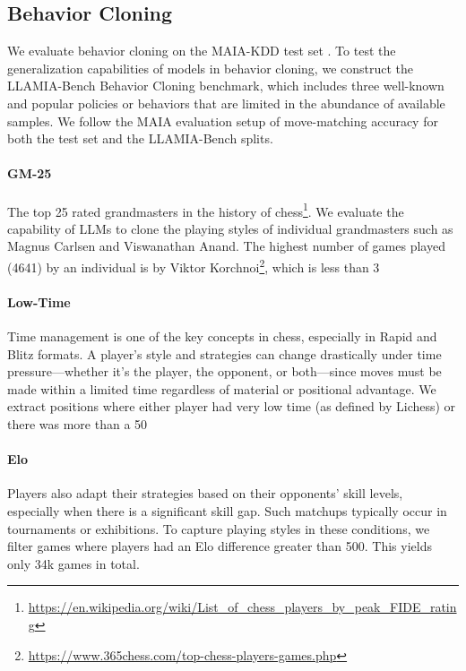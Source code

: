 \documentclass{article}
\theoremstyle{plain}
\theoremstyle{definition}
\theoremstyle{remark}
\begin{document}
\subsection{Behavior Cloning}
We evaluate behavior cloning on the MAIA-KDD test set \cite{mcilroy2020aligning}. To test the generalization capabilities of models in behavior cloning, we construct the LLAMIA-Bench Behavior Cloning benchmark, which includes three well-known and popular policies or behaviors that are limited in the abundance of available samples. We follow the MAIA evaluation setup of move-matching accuracy for both the test set and the LLAMIA-Bench splits.

\paragraph{GM-25}
The top 25 rated grandmasters in the history of chess\footnote{\url{https://en.wikipedia.org/wiki/List_of_chess_players_by_peak_FIDE_rating}}. We evaluate the capability of LLMs to clone the playing styles of individual grandmasters such as Magnus Carlsen and Viswanathan Anand. The highest number of games played (4641) by an individual is by Viktor Korchnoi\footnote{\url{https://www.365chess.com/top-chess-players-games.php}}, which is less than 3%

\paragraph{Low-Time}
Time management is one of the key concepts in chess, especially in Rapid and Blitz formats. A player’s style and strategies can change drastically under time pressure—whether it’s the player, the opponent, or both—since moves must be made within a limited time regardless of material or positional advantage. We extract positions where either player had very low time (as defined by Lichess) or there was more than a 50%

\paragraph{Elo}
Players also adapt their strategies based on their opponents’ skill levels, especially when there is a significant skill gap. Such matchups typically occur in tournaments or exhibitions. To capture playing styles in these conditions, we filter games where players had an Elo difference greater than 500. This yields only 34k games in total.
\end{document}
